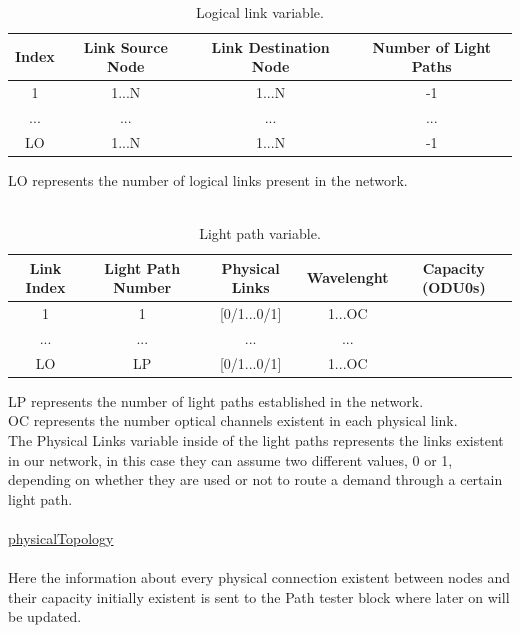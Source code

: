 \begin{table}[H]
	\centering
	\begin{tabular}{|c|c|c|c|}
		\hline
		Index & Link Source Node & Link Destination Node & Number of Light Paths \\ \hline
		1     & 1...N            & 1...N                 & -1                 \\ \hline
		...   & ...              & ...                   & ...                   \\ \hline
		LO    & 1...N            & 1...N                 & -1                 \\ \hline
	\end{tabular}
	\caption{Logical link variable.}
	\label{logicalLink_variable}
\end{table}

LO represents the number of logical links present in the network.\\ \\
\begin{table}[H]
	\centering
	\begin{tabular}{|c|c|c|c|c|}
		\hline
		Link Index & Light Path Number & Physical Links  & Wavelenght & Capacity (ODU0s) \\ \hline
		1          & 1                 & {[}0/1...0/1{]} & 1...OC     &                  \\ \hline
		...        & ...               & ...             & ...        &                  \\ \hline
		LO         & LP                & {[}0/1...0/1{]} & 1...OC     &                  \\ \hline
	\end{tabular}
	\caption{Light path variable.}
	\label{lightpath_example}
\end{table}
LP represents the number of light paths established in the network.\\
OC represents the number optical channels existent in each physical link.\\
The Physical Links variable inside of the light paths represents the links existent in our network, in this case they can assume two different values, 0 or 1, depending on whether they are used or not to route a demand through a certain light path.\\ \\
\underline{physicalTopology}\\
\\
Here the information about every physical connection existent between nodes and their capacity initially existent is sent to the Path tester block where later on will be updated.

